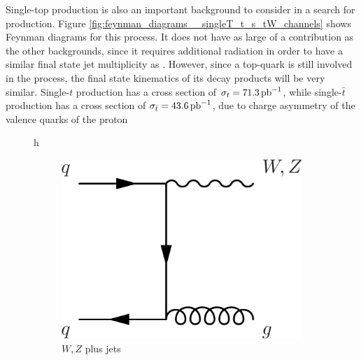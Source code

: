 \par Single-top production is also an important background to consider
in a search for \ttH production.  Figure
\ref{fig:feynman_diagrams__singleT_t_s_tW_channels} shows Feynman
diagrams for this process.  It does not have as large of a
contribution as the other backgrounds, since it requires additional
radiation in order to have a similar final state jet multiplicity as
\ttH.  However, since a top-quark is still involved in the process,
the final state kinematics of its decay products will be very similar.
 Single-$t$ production has a cross section of $\sigma_{t}=71.3\mbox{\ensuremath{\,\text{pb}^\text{$-$1}}}$,
 while single-$\bar{t}$ production has a cross section of
 $\sigma_{\bar{t}}=43.6\mbox{\ensuremath{\,\text{pb}^\text{$-$1}}}$, due to charge asymmetry of the valence
 quarks of the proton

\begin{figure}{h}
    \centering
    \begin{subfigure}[h]{0.3\textwidth}
        \includegraphics[width=\textwidth]{Figures/Feynman_Diagrams/backgrounds__VplusJets.pdf}
        \caption{$W,Z$ plus jets}\label{fd:t_tChan}
      \end{subfigure}
      ~ %
      \begin{subfigure}[h]{0.3\textwidth}

\end{subfigure}
\end{figure}

